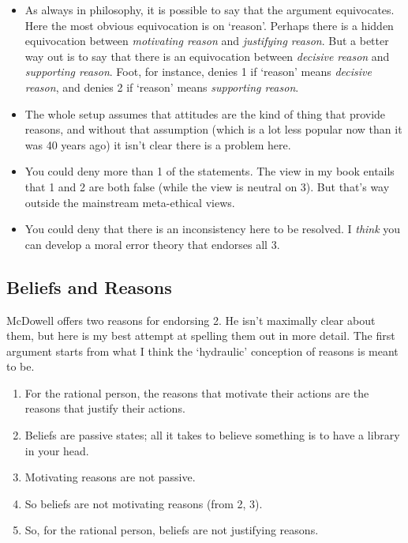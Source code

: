 \documentclass[
]{article}
\providecommand{\tightlist}{%
  \setlength{\itemsep}{0pt}\setlength{\parskip}{0pt}}
\begin{document}
\begin{itemize}
\tightlist
\item
  As always in philosophy, it is possible to say that the argument
  equivocates. Here the most obvious equivocation is on `reason'.
  Perhaps there is a hidden equivocation between \emph{motivating
  reason} and \emph{justifying reason}. But a better way out is to say
  that there is an equivocation between \emph{decisive reason} and
  \emph{supporting reason}. Foot, for instance, denies 1 if `reason'
  means \emph{decisive reason}, and denies 2 if `reason' means
  \emph{supporting reason}.
\item
  The whole setup assumes that attitudes are the kind of thing that
  provide reasons, and without that assumption (which is a lot less
  popular now than it was 40 years ago) it isn't clear there is a
  problem here.
\item
  You could deny more than 1 of the statements. The view in my book
  entails that 1 and 2 are both false (while the view is neutral on 3).
  But that's way outside the mainstream meta-ethical views.
\item
  You could deny that there is an inconsistency here to be resolved. I
  \emph{think} you can develop a moral error theory that endorses all 3.
\end{itemize}

\newpage

\hypertarget{beliefs-and-reasons}{%
\subsection{Beliefs and Reasons}\label{beliefs-and-reasons}}

McDowell offers two reasons for endorsing 2. He isn't maximally clear
about them, but here is my best attempt at spelling them out in more
detail. The first argument starts from what I think the `hydraulic'
conception of reasons is meant to be.

\begin{enumerate}
\def\labelenumi{\arabic{enumi}.}
\tightlist
\item
  For the rational person, the reasons that motivate their actions are
  the reasons that justify their actions.
\item
  Beliefs are passive states; all it takes to believe something is to
  have a library in your head.
\item
  Motivating reasons are not passive.
\item
  So beliefs are not motivating reasons (from 2, 3).
\item
  So, for the rational person, beliefs are not justifying reasons.
\end{enumerate}
\end{document}
